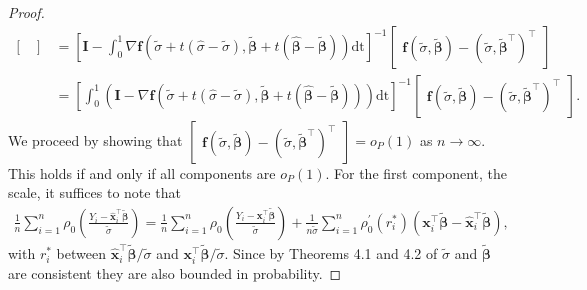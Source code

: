 \documentclass[11pt]{article}
\begin{document}
\begin{proof}
\begin{align}
\begin{bmatrix}
\end{bmatrix} &= \left[ \mathbf{I}- \int_{0}^1   \nabla{\mathbf{f}} \left( \widetilde{\sigma} + t \left(\widehat{\sigma} - \widetilde{\sigma} \right),  \boldsymbol{\widetilde{\beta}} + t \left( \boldsymbol{\widehat{\beta}}-\boldsymbol{\widetilde{\beta}} \right) \right) \mathrm{dt} \right]^{-1} \begin{bmatrix} \mathbf{f} \left(\widetilde{\sigma}, \widetilde{\boldsymbol{\beta}} \right)
-\left(\widetilde{\sigma}, \boldsymbol{\widetilde{\beta}}^{\top} \right)^{\top}\end{bmatrix} \nonumber \\
& = \left[ \int_{0}^1 \left( \mathbf{I}-    \nabla{\mathbf{f}} \left( \widetilde{\sigma} + t \left(\widehat{\sigma} - \widetilde{\sigma} \right),  \boldsymbol{\widetilde{\beta}} + t \left( \boldsymbol{\widehat{\beta}} - \boldsymbol{\widetilde{\beta}} \right) \right) \right) \mathrm{dt} \right]^{-1} \begin{bmatrix} \mathbf{f} \left(\widetilde{\sigma}, \widetilde{\boldsymbol{\beta}} \right)
-\left(\widetilde{\sigma}, \boldsymbol{\widetilde{\beta}}^{\top} \right)^{\top} \end{bmatrix}.
\end{align}
We proceed by showing that $ \begin{bmatrix} \mathbf{f} \left(\widetilde{\sigma}, \widetilde{\boldsymbol{\beta}} \right)
-\left(\widetilde{\sigma}, \boldsymbol{\widetilde{\beta}}^{\top} \right)^{\top}\end{bmatrix} = o_P(1)$ as $n \to \infty$. This holds if and only if all components are $o_{P}(1)$. For the first component, the scale, it suffices to note that
\begin{align*}
\frac{1}{n}\sum_{i=1}^n \rho_0 \left( \frac{Y_i - \widehat{\mathbf{x}}_i^{\top} \widetilde{\boldsymbol{\beta}} }{\widetilde{\sigma}} \right) = \frac{1}{n} \sum_{i=1}^n \rho_0 \left( \frac{Y_i - \mathbf{x}_i^{\top} \widetilde{\boldsymbol{\beta}}}{\widetilde{\sigma}}  \right) + \frac{1}{n\widetilde{\sigma}} \sum_{i=1}^n  \rho^{\prime}_0\left(r_i^{*} \right) \left(  \mathbf{x}_i^{\top} \widetilde{\boldsymbol{\beta}} -  \widehat{\mathbf{x}}_i^{\top} \widetilde{\boldsymbol{\beta}} \right),
\end{align*}
with $r^{*}_i$ between $\widehat{\mathbf{x}}_i^{\top} \widetilde{\boldsymbol{\beta}}/\widetilde{\sigma}$ and $\mathbf{x}_i^{\top} \widetilde{\boldsymbol{\beta}}/\widetilde{\sigma}$. Since by Theorems 4.1 and 4.2 of \citep{yohaitec} $\widetilde{\sigma}$ and $\widetilde{\boldsymbol{\beta}}$ are consistent they are also bounded in probability. 

\end{proof}
\end{document}
